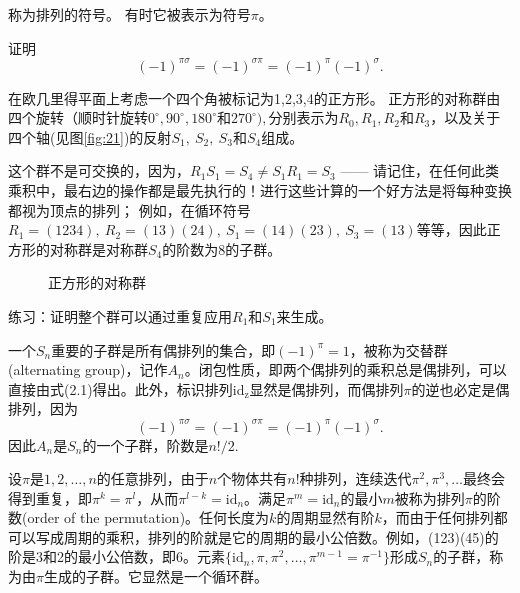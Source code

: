 称为排列的符号。 有时它被表示为符号$\pi$。
 \begin{exercise}证明
$$
(-1)^{\pi\sigma}=(-1)^{\sigma\pi}=(-1)^{\pi}(-1)^{\sigma}.
$$
\end{exercise}
\begin{eg}
在欧几里得平面上考虑一个四个角被标记为1,2,3,4的正方形。 正方形的对称群由四个旋转（顺时针旋转$0^{\circ }, 90^{\circ }, 180^{\circ }$和$270^{\circ }) , $分别表示为$R_0,R_1,R_2$和$R_3$，以及关于四个轴(见图\ref{fig:21})的反射$S_{1},\:S_{2},\:S_{3}$和$S_{4}$组成。

这个群不是可交换的，因为，$R_1S_1=S_4\neq S_1R_1=S_3$ —— 请记住，在任何此类乘积中，最右边的操作都是最先执行的！进行这些计算的一个好方法是将每种变换都视为顶点的排列； 例如，在循环符号$R_1=(1234),\:R_2=(13)(24),\:S_1=(14)(23),\:S_3=(13)$等等，因此正方形的对称群是对称群$S_{4}$的阶数为8的子群。
\end{eg}
\begin{figure}
    \centering
      \caption{正方形的对称群}
\end{figure}\label{fig:21}

\begin{exercise}
练习：证明整个群可以通过重复应用$R_{1}$和$S_{1}$来生成。
\end{exercise}
\begin{eg}
    一个$S_n$重要的子群是所有偶排列的集合，即$(-1)^{\pi}=1$，被称为交替群(alternating group)，记作$A_n$。闭包性质，即两个偶排列的乘积总是偶排列，可以直接由式(2.1)得出。此外，标识排列id$_\mathrm{z}$显然是偶排列，而偶排列$\pi$的逆也必定是偶排列，因为
    \begin{equation}(-1)^{\pi\sigma}=(-1)^{\sigma\pi}=(-1)^{\pi}(-1)^{\sigma}.
    \end{equation}
   因此$A_n$是$S_n$的一个子群，阶数是$n!/2.$ 
\end{eg}
  
\begin{eg}
    设$\pi$是$1,2,\ldots,n$的任意排列，由于$n$个物体共有$n$!种排列，连续迭代$\pi^2,\pi^3,\ldots$最终会得到重复，即$\pi^k=\pi^l$，从而$\pi^{l-k}=\mathrm{id}_n$。满足$\pi^m=\mathrm{id}_n$的最小$m$被称为排列$\pi$的阶数(order of the permutation)。任何长度为$k$的周期显然有阶$k$，而由于任何排列都可以写成周期的乘积，排列的阶就是它的周期的最小公倍数。例如，(123)(45)的阶是3和2的最小公倍数，即6。元素$\{\mathrm{id}_n,\pi,\pi^2,\ldots,\pi^{m-1}=\pi^{-1}\}$形成$S_n$的子群，称为由$\pi$生成的子群。它显然是一个循环群。
\end{eg}
 

